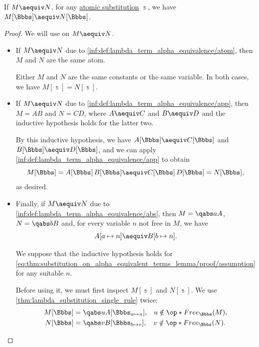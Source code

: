 \begin{proposition}\label{thm:substitution_on_alpha_equivalent_terms}
  If \( M \aequiv N \), for any \hyperref[def:atomic_lambda_term_substitution]{atomic substitution} \( \Bbbs \), we have \( M[\Bbbs] \aequiv N[\Bbbs] \).
\end{proposition}
\begin{proof}
  We will use  on \( M \aequiv N \).

  \begin{itemize}
    \item If \( M \aequiv N \) due to \ref{inf:def:lambda_term_alpha_equivalence/atom}, then \( M \) and \( N \) are the same atom.

    Either \( M \) and \( N \) are the same constants or the same variable. In both cases, we have \( M[\Bbbs] = N[\Bbbs] \).

    \item If \( M \aequiv N \) due to \ref{inf:def:lambda_term_alpha_equivalence/app}, then \( M = AB \) and \( N = CD \), where \( A \aequiv C \) and \( B \aequiv D \) and the inductive hypothesis holds for the latter two.

    By this inductive hypothesis, we have \( A[\Bbbs] \aequiv C[\Bbbs] \) and \( B[\Bbbs] \aequiv D[\Bbbs] \), and we can apply \ref{inf:def:lambda_term_alpha_equivalence/app} to obtain
    \begin{equation*}
      M[\Bbbs]
      =
      A[\Bbbs] \thinspace B[\Bbbs]
      \aequiv
      C[\Bbbs] \thinspace D[\Bbbs]
      =
      N[\Bbbs],
    \end{equation*}
    as desired.

    \item Finally, if \( M \aequiv N \) due to \ref{inf:def:lambda_term_alpha_equivalence/abs}, then \( M = \qabs a A \), \( N = \qabs b B \) and, for every variable \( n \) not free in \( M \), we have
    \begin{equation}\label{eq:thm:substitution_on_alpha_equivalent_terms_lemma/proof/assumption}
      A[a \mapsto n] \aequiv B[b \mapsto n].
    \end{equation}

    We suppose that the inductive hypothesis holds for \eqref{eq:thm:substitution_on_alpha_equivalent_terms_lemma/proof/assumption} for any suitable \( n \).

    Before using it, we must first inspect \( M[\Bbbs] \) and \( N[\Bbbs] \). We use \cref{thm:lambda_substitution_single_rule} twice:
    \begin{align*}
      M[\Bbbs] &= \qabs u A[\Bbbs_{a \mapsto u}], &&u \notin \op*{Free}_\Bbbs(M), \\
      N[\Bbbs] &= \qabs v B[\Bbbs_{b \mapsto v}], &&v \notin \op*{Free}_\Bbbs(N).
    \end{align*}


\end{itemize}
\end{proof}
